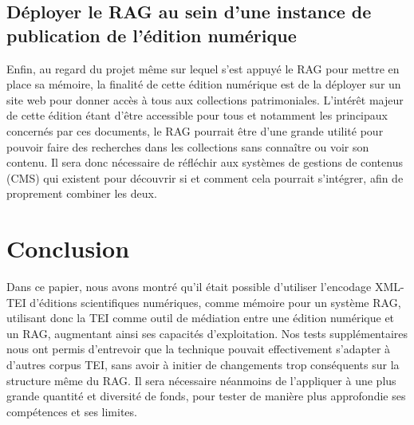\documentclass[final, fra]{anthology-ch}     %
\begin{document}
\subsection{Déployer le RAG au sein d’une instance de publication de l’édition numérique}
Enfin, au regard du projet même sur lequel s’est appuyé le RAG pour mettre en place sa mémoire, la finalité de cette édition numérique est de la déployer sur un site web pour donner accès à tous aux collections patrimoniales. L'intérêt majeur de cette édition étant d’être accessible pour tous et notamment les principaux concernés par ces documents, le RAG pourrait être d’une grande utilité pour pouvoir faire des recherches dans les collections sans connaître ou voir son contenu. Il sera donc nécessaire de réfléchir aux systèmes de gestions de contenus (CMS) qui existent pour découvrir si et comment cela pourrait s’intégrer, afin de proprement combiner les deux.

\section*{Conclusion}
Dans ce papier, nous avons montré qu’il était possible d’utiliser l’encodage XML-TEI d’éditions scientifiques numériques, comme mémoire pour un système RAG, utilisant donc la TEI comme outil de médiation entre une édition numérique et un RAG, augmentant ainsi ses capacités d’exploitation.
Nos tests supplémentaires nous ont permis d’entrevoir que la technique pouvait effectivement s’adapter à d’autres corpus TEI, sans avoir à initier de changements trop conséquents sur la structure même du RAG. Il sera nécessaire néanmoins de l’appliquer à une plus grande quantité et diversité de fonds, pour tester de manière plus approfondie ses compétences et ses limites.



\printbibliography

\bigskip

\appendix

\end{document}
